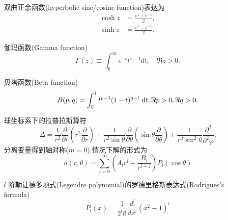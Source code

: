 \documentclass{njustexam}
\begin{document}
\bigskip

双曲正余函数(hyperbolic sine/cosine function)表达为
\begin{align*}
    \cosh z&= \frac{e^{z} + e^{ - z} }{2} , 
    \\
    \sinh z &= \frac{e^{z} - e^{ - z} }{2} . 
\end{align*}

伽玛函数(Gamma function)
\begin{equation*}
  \Gamma(z) \equiv \int_{0}^{\infty} e^{-t} t^{z-1} d t,  \quad \Re z>0 . 
\end{equation*}
\bigskip

贝塔函数(Beta function)
\begin{equation*}
    B(p,  q) = \int_0^1 t^{p -1} (1-t)^{q-1} \mathop{}\!\mathrm{d} t,  \Re p> 0,  \Re q >0. 
    \label{eq:beta_def1}
\end{equation*}
\bigskip



球坐标系下的拉普拉斯算符
\begin{equation*}
 \Delta = \frac{1}{r^2} \frac{\partial}{\partial r} \left( r^2 \frac{\partial }{\partial r} \right)
  + \frac{1}{r^2\sin \theta} \frac{\partial}{\partial \theta} \left( \sin\theta \frac{\partial}{\partial \theta} \right)
  + \frac{1}{r^2\sin^2 \theta} \frac{\partial^2}{\partial^2 \varphi} .
\end{equation*}
分离变量得到轴对称($m=0$)
情况下解的形式为
\begin{equation*}
  u(r,  \theta) = \sum_{l=0}^{\infty} \left( A_l r^l + \frac{B_l}{r^{l+1}} \right) P_{l} (\cos \theta)
\end{equation*}

\bigskip

$l$ 阶勒让德多项式(Legendre polynomial)的罗德里格斯表达式(Rodrigues's formula) 
$$P_l(x)=\frac{1}{2^l l !} \frac{d^l}{d x^l}\left(x^2-1\right)^l$$
\end{document}
